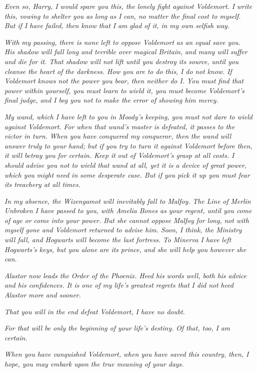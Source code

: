 \emph{Even so, Harry, I would spare you this, the lonely fight against Voldemort. I write this, vowing to shelter you as long as I can, no matter the final cost to myself. But if I have failed, then know that I am glad of it, in my own selfish way.}

\emph{With my passing, there is none left to oppose Voldemort as an equal save you. His shadow will fall long and terrible over magical Britain, and many will suffer and die for it. That shadow will not lift until you destroy its source, until you cleanse the heart of the darkness. How you are to do this, I do not know. If Voldemort knows not the power you bear, then neither do I. You must find that power within yourself, you must learn to wield it, you must become Voldemort's final judge, and I beg you not to make the error of showing him mercy.}

\emph{My wand, which I have left to you in Moody's keeping, you must not dare to wield against Voldemort. For when that wand's master is defeated, it passes to the victor in turn. When you have conquered my conqueror, then the wand will answer truly to your hand; but if you try to turn it against Voldemort before then, it will betray you for certain. Keep it out of Voldemort's grasp at all costs. I should advise you not to wield that wand at all, yet it is a device of great power, which you might need in some desperate case. But if you pick it up you must fear its treachery at all times.}

\emph{In my absence, the Wizengamot will inevitably fall to Malfoy. The Line of Merlin Unbroken I have passed to you, with Amelia Bones as your regent, until you come of age or come into your power. But she cannot oppose Malfoy for long, not with myself gone and Voldemort returned to advise him. Soon, I think, the Ministry will fall, and Hogwarts will become the last fortress. To Minerva I have left Hogwarts's keys, but you alone are its prince, and she will help you however she can.}

\emph{Alastor now leads the Order of the Phoenix. Heed his words well, both his advice and his confidences. It is one of my life's greatest regrets that I did not heed Alastor more and sooner.}

\emph{That you will in the end defeat Voldemort, I have no doubt.}

\emph{For that will be only the beginning of your life's destiny. Of that, too, I am certain.}

\emph{When you have vanquished Voldemort, when you have saved this country, then, I hope, you may embark upon the true meaning of your days.}

